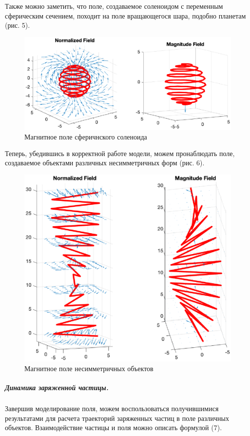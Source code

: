 \documentclass[12pt,a4paper]{article}
\begin{document}
Также можно заметить, что поле, создаваемое соленоидом с переменным сферическим сечением, походит на поле вращающегося шара, подобно планетам (рис. 5).
\begin{figure}[H]
    \centering
    \includegraphics[width=\linewidth]{pics/sphere.eps}
    \caption{Магнитное поле сферичнского соленоида}
\end{figure}

Теперь, убедившись в корректной работе модели, можем пронаблюдать поле, создаваемое объектами различных несимметричных форм (рис. 6).
\begin{figure}[H]
    \centering
    \includegraphics[width=\linewidth]{pics/gen.eps}
    \caption{Магнитное поле несимметричных объектов}
\end{figure}

\subparagraph*{Динамика заряженной частицы.}
Завершив моделирование поля, можем воспользоваться получившимися результатами для расчета траекторий заряженных частиц в поле различных объектов.
Взаимодействие частицы и поля можно описать формулой (7).
\end{document}
